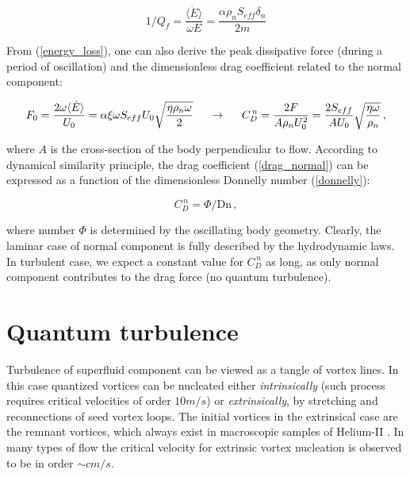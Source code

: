 \begin{equation}
1 / Q_f = \frac{\langle \dot{E} \rangle}{\omega E} = \frac{\alpha \rho_n S_{eff} \delta_n}{2m}
\label{quality}
\end{equation}

From (\ref{energy_loss}), one can also derive the peak dissipative force (during a period of oscillation) and the dimensionless drag coefficient related to the normal component:

\begin{equation}
F_0 = \frac{2 \omega \langle \dot{E} \rangle}{U_0}
= \alpha \xi \omega S_{eff} U_0 \sqrt{\frac{\eta \rho_n \omega}{2}}
\hspace{5mm}
\rightarrow
\hspace{5mm}
C_D^{\,n} = \frac{2 F}{A \rho_n U_0^2} = \frac{2 S_{eff}}{A U_0} \sqrt{\frac{\eta \omega}{\rho_n}}\,,
\label{drag_normal}
\end{equation}

where $A$ is the cross-section of the body perpendicular to flow. According to dynamical similarity principle, the drag coefficient (\ref{drag_normal}) can be expressed as a function of the dimensionless Donnelly number (\ref{donnelly}):

\begin{equation}
C_D^{\,n} = \Phi / \text{Dn}\,,
\end{equation}

where number $\Phi$ is determined by the oscillating body geometry. Clearly, the laminar case of normal component is fully described by the hydrodynamic laws. In turbulent case, we expect a constant value for $C_D^{\,n}$ as long, as only normal component contributes to the drag force (no quantum turbulence).

\section{Quantum turbulence}

Turbulence of superfluid component can be viewed as a tangle of vortex lines. In this case quantized vortices can be nucleated either \textit{intrinsically} (such process requires critical velocities of order $10 \unit{m/s}$) or \textit{extrinsically}, by stretching and reconnections of seed vortex loops. The initial vortices in the extrinsical case are the remnant vortices, which always exist in macroscopic samples of Helium-II . In many types of flow the critical velocity for extrinsic vortex nucleation is observed to be in order $\sim\unit{cm/s}$.

